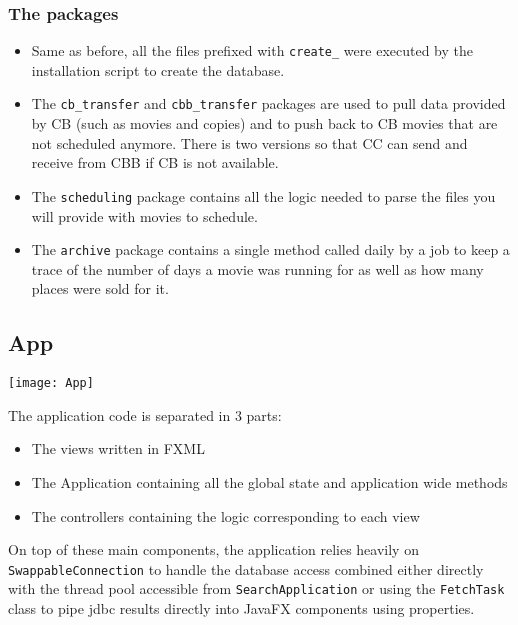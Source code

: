 \documentclass[a4paper]{article}
\begin{document}
\subsubsection{The packages}

\begin{itemize}
	\item Same as before, all the files prefixed with \texttt{create\_} were executed by the installation script to create the database.
	\item The \texttt{cb\_transfer} and \texttt{cbb\_transfer} packages are used to pull data provided by CB (such as movies and copies) and to push back to CB movies that are not scheduled anymore. There is two versions so that CC can send and receive from CBB if CB is not available.
	\item The \texttt{scheduling} package contains all the logic needed to parse the files you will provide with movies to schedule.
	\item The \texttt{archive} package contains a single method called daily by a job to keep a trace of the number of days a movie was running for as well as how many places were sold for it.
\end{itemize}

\subsection{App}

\texttt{[image: App]}

The application code is separated in 3 parts:

\begin{itemize}
	\item The views written in FXML
	\item The Application containing all the global state and application wide methods
	\item The controllers containing the logic corresponding to each view
\end{itemize}

On top of these main components, the application relies heavily on \texttt{SwappableConnection} to handle the database access combined either directly with the thread pool accessible from \texttt{SearchApplication} or using the \texttt{FetchTask} class to pipe jdbc results directly into JavaFX components using properties.
\end{document}
